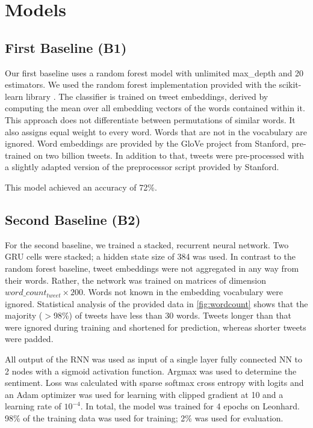 \documentclass[10pt,conference,compsocconf]{IEEEtran}
\begin{document}
\section{Models}

\subsection{First Baseline (B1)}

Our first baseline uses a random forest model with unlimited
max\_depth and 20 estimators. We used the random forest implementation
provided with the scikit-learn library \cite{scikit-learn}.
The classifier is trained on tweet embeddings,
derived by computing the mean over all embedding
vectors of the words contained within it. This approach does not
differentiate between permutations of similar words. It also assigns
equal weight to every word. Words that are not in the vocabulary are
ignored. Word embeddings are provided by the GloVe \cite{glove}
project from Stanford, pre-trained on two billion tweets. In addition
to that, tweets were pre-processed with a slightly adapted version of
the preprocessor script provided by Stanford.

This model achieved an accuracy of 72\%.


\subsection{Second Baseline (B2)}

For the second baseline, we trained a stacked, recurrent neural
network. Two GRU cells were stacked; a hidden state size of 384 was used.
In contrast to the random forest baseline, tweet embeddings
were not aggregated in any way from their words. Rather, the network
was trained on matrices of dimension \(word\_count_{tweet} \times 200\).
Words not known in the embedding vocabulary were ignored.
Statistical analysis of the provided data in \autoref{fig:wordcount} shows that
the majority ($>$98\%) of tweets have less than 30 words.
Tweets longer than that were ignored during training and shortened for prediction,
whereas shorter tweets were padded.

All output of the RNN was used as input of a single layer fully connected NN
to 2 nodes with a sigmoid activation function.
Argmax was used to determine the sentiment.
Loss was calculated with sparse softmax cross entropy with logits and
an Adam optimizer was used for learning with clipped gradient at 10
and a learning rate of $10^{-4}$.
In total, the model was trained for 4 epochs on Leonhard.
98\% of the training data was used for training; 2\% was used for evaluation.
\end{document}
